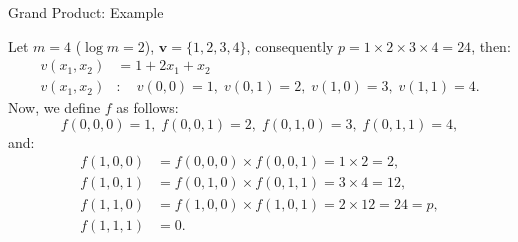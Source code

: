 \documentclass{zkdl-presentation-template}
\begin{document}
    \begin{frame}{Grand Product: Example}
        \begin{example}
            Let $m=4$ ($\log m=2$), $\mathbf{v} = \{1, 2, 3, 4\}$, consequently $p = 1\times2\times3\times4=24$, then:
            \begin{align*}
            v(x_1, x_2)& = 1 + 2x_1 + x_2\\
            v(x_1,x_2)&: \quad v(0,0)=1,\; v(0,1)=2,\; v(1,0)=3,\; v(1,1)=4.
            \end{align*}
            \pause
            Now, we define $f$ as follows:
            \vspace{-5px}
            \begin{equation*}
                f(0,0,0)= 1,\; f(0,0,1)=2,\; f(0,1,0)=3,\; f(0,1,1)=4,
            \end{equation*}
            \pause
            and:
            \vspace{-10px}
            \begin{align*}
            f(1,0,0)&= f(0,0,0) \times f(0,0,1) = 1 \times 2 = 2,\\
            f(1,0,1)&= f(0,1,0) \times f(0,1,1) = 3 \times 4 = 12,\\
            f(1,1,0)&= f(1,0,0) \times f(1,0,1) = 2 \times 12 = 24 = p,\\
            f(1,1,1)&= 0.
            \end{align*}
        \end{example}
    \end{frame}
\end{document}
